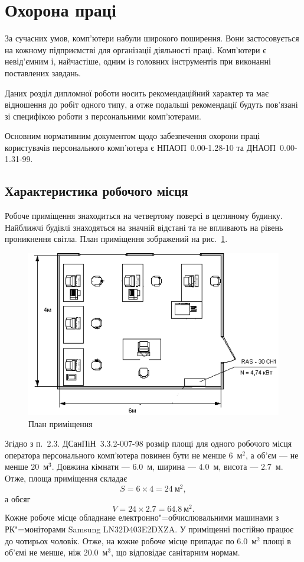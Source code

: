 \documentclass[simple,14pt,utf8,ukrainian]{eskdtext}
\begin{document}
\tableofcontents
\clearpage
\section{Охорона праці}\label{sec:WS}
  За сучасних умов, комп’ютери набули широкого поширення.
  Вони застосовується на кожному підприємстві для організації діяльності
  праці.
  Комп’ютери є невід’ємним і, найчастіше, одним із головних інструментів при
  виконанні поставлених завдань.

  Даних розділ дипломної роботи носить рекомендаційний характер та має
  відношення до робіт одного типу, а отже подальші рекомендації будуть
  пов’язані зі специфікою роботи з персональними комп’ютерами.

  Основним нормативним документом щодо забезпечення охорони праці користувачів
  персонального комп’ютера є НПАОП~0.00-1.28-10 та ДНАОП~0.00-1.31-99.
  \subsection{Характеристика робочого місця}
    Робоче приміщення знаходиться на четвертому поверсі в цегляному будинку.
    Найближчі будівлі знаходяться на значній відстані та не впливають на
    рівень проникнення світла.
    План приміщення зображений на рис.~\ref{fig:plan}.
    \begin{figure}[ht]
      \centering
      \includegraphics{plan.png}
      \caption{План приміщення}
      \label{fig:plan}
    \end{figure}

    Згідно з п.~2.3. ДСанПіН~3.3.2-007-98 розмір площі для одного робочого
    місця оператора персонального комп’ютера повинен бути не менше $6$~м$^2$,
    а об’єм --- не менше $20$~м$^3$\cite{dsanpin}.
    Довжина кімнати --- $6.0$~м, ширина --- $4.0$~м, висота --- $2.7$~м.
    Отже, площа приміщення складає
      \[
        S = 6 \times 4 = 24~\text{м}^2,
      \]
    а обсяг
      \[
        V = 24 \times 2.7 = 64.8~\text{м}^2.
      \]
    Кожне робоче місце обладнане електронно"=обчислювальними машинами з
    РК"=моніторами Samsung LN32D403E2DXZA.
    У приміщенні постійно працює до чотирьох чоловік.
    Отже, на кожне робоче місце припадає по $6.0$~м$^2$ площі в об’ємі не
    менше, ніж $20.0$~м$^3$, що відповідає санітарним нормам.
\end{document}
